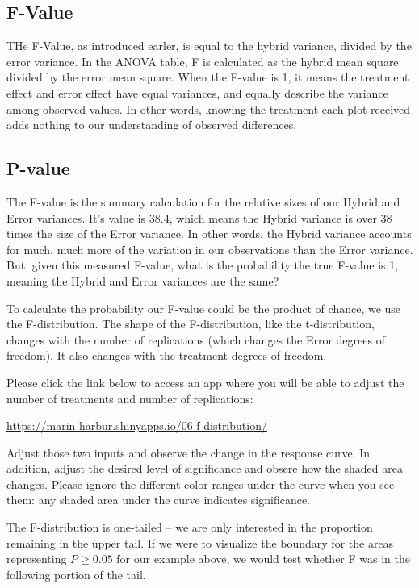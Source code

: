 \documentclass[
]{book}
\begin{document}
\hypertarget{f-value}{%
\subsection{F-Value}\label{f-value}}

THe F-Value, as introduced earler, is equal to the hybrid variance, divided by the error variance. In the ANOVA table, F is calculated as the hybrid mean square divided by the error mean square. When the F-value is 1, it means the treatment effect and error effect have equal variances, and equally describe the variance among observed values. In other words, knowing the treatment each plot received adds nothing to our understanding of observed differences.

\hypertarget{p-value-1}{%
\subsection{P-value}\label{p-value-1}}

The F-value is the summary calculation for the relative sizes of our Hybrid and Error variances. It's value is 38.4, which means the Hybrid variance is over 38 times the size of the Error variance. In other words, the Hybrid variance accounts for much, much more of the variation in our observations than the Error variance. But, given this measured F-value, what is the probability the true F-value is 1, meaning the Hybrid and Error variances are the same?

To calculate the probability our F-value could be the product of chance, we use the F-distribution. The shape of the F-distribution, like the t-distribution, changes with the number of replications (which changes the Error degrees of freedom). It also changes with the treatment degrees of freedom.

Please click the link below to access an app where you will be able to adjust the number of treatments and number of replications:

\url{https://marin-harbur.shinyapps.io/06-f-distribution/}

Adjust those two inputs and observe the change in the response curve. In addition, adjust the desired level of significance and obsere how the shaded area changes. Please ignore the different color ranges under the curve when you see them: any shaded area under the curve indicates significance.

The F-distribution is one-tailed -- we are only interested in the proportion remaining in the upper tail. If we were to visualize the boundary for the areas representing \(P\ge0.05\) for our example above, we would test whether F was in the following portion of the tail.
\end{document}
